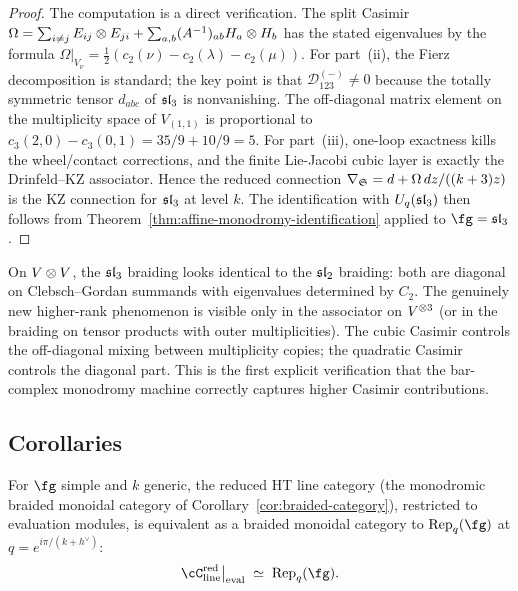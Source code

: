 \begin{proof}
The computation is a direct verification. The split Casimir $\Omega = \sum_{i \neq j} E_{ij} \otimes E_{ji} + \sum_{a,b} (A^{-1})_{ab} H_a \otimes H_b$ has the stated eigenvalues by the formula $\Omega|_{V_\nu} = \frac{1}{2}(c_2(\nu) - c_2(\lambda) - c_2(\mu))$. For part~(ii), the Fierz decomposition is standard; the key point is that $\mathcal{D}_{123}^{(-)} \neq 0$ because the totally symmetric tensor $d_{abc}$ of $\mathfrak{sl}_3$ is nonvanishing. The off-diagonal matrix element on the multiplicity space of $V_{(1,1)}$ is proportional to $c_3(2,0) - c_3(0,1) = 35/9 + 10/9 = 5$. For part~(iii), one-loop exactness kills the wheel/contact corrections, and the finite Lie-Jacobi cubic layer is exactly the Drinfeld--KZ associator. Hence the reduced connection $\nabla_{\mathfrak{S}} = d + \Omega\,dz/((k+3)z)$ is the KZ connection for $\mathfrak{sl}_3$ at level $k$. The identification with $U_q(\mathfrak{sl}_3)$ then follows from Theorem~\ref{thm:affine-monodromy-identification} applied to $\fg = \fsl_3$.
\end{proof}

\begin{remark}
\label{rem:cubic-through-associator}
On $V \otimes V$, the $\mathfrak{sl}_3$ braiding looks identical to the $\mathfrak{sl}_2$ braiding: both are diagonal on Clebsch--Gordan summands with eigenvalues determined by $C_2$. The genuinely new higher-rank phenomenon is visible only in the associator on $V^{\otimes 3}$ (or in the braiding on tensor products with outer multiplicities). The cubic Casimir controls the off-diagonal mixing between multiplicity copies; the quadratic Casimir controls the diagonal part. This is the first explicit verification that the bar-complex monodromy machine correctly captures higher Casimir contributions.
\end{remark}

\subsection{Corollaries}

\begin{corollary}
\label{cor:affine-line-category}
For $\fg$ simple and $k$ generic, the reduced HT line category (the monodromic braided monoidal category of Corollary~\textup{\ref{cor:braided-category}}), restricted to evaluation modules, is equivalent as a braided monoidal category to $\mathrm{Rep}_q(\fg)$ at $q = e^{i\pi/(k + h^\vee)}$:
\[
 \cC_{\mathrm{line}}^{\mathrm{red}}\big|_{\mathrm{eval}} \;\simeq\; \mathrm{Rep}_q(\fg).
\]
\end{corollary}

